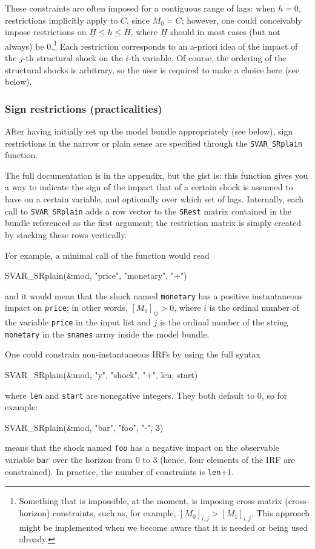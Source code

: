 \documentclass[a4paper,10pt]{article}
\begin{document}
These constraints are often imposed for a contiguous range of lags:
when $h=0$, restrictions implicitly apply to $C$, since $M_0 = C$;
however, one could conceivably impose restrictions on
$\underline{H} \le h \le \overline{H}$, where $\underline{H}$ should
in most cases (but not always) be 0.\footnote{Something that is impossible,
  at the moment, is imposing cross-matrix (cross-horizon) constraints, such 
  as, for example, $[M_0]_{i,j} > [M_1]_{i,j}$. This approach might be 
  implemented when we become aware that it is needed or being used 
  already.} Each restriction corresponds to an
a-priori idea of the impact of the $j$-th structural shock on the
$i$-th variable. Of course, the ordering of the structural shocks is
arbitrary, so the user is required to make a choice here (see below).

\subsubsection{Sign restrictions (practicalities)}

After having initially set up the model bundle appropriately (see
below), sign restrictions in the narrow or plain sense are specified
through the \texttt{SVAR\_SRplain} function.

The full documentation is in the appendix, but the gist is: this
function gives you a way to indicate the sign of the impact that of a
certain shock is assumed to have on a certain variable, and optionally
over which set of lags. Internally, each call to
\texttt{SVAR\_SRplain} adds a row vector to the \texttt{SRest} matrix
contained in the bundle referenced as the first argument; the
restriction matrix is simply created by stacking these rows
vertically.

For example, a minimal call of the function would read
\begin{code}
  SVAR_SRplain(&mod, "price", "monetary", "+")
\end{code}
and it would mean that the shock named \texttt{monetary} has a
positive instantaneous impact on \texttt{price}; in other words,
$[M_0]_{ij} > 0$, where $i$ is the ordinal number of the variable
\texttt{price} in the input list and $j$ is the ordinal number of the
string \texttt{monetary} in the \texttt{snames} array inside the model
bundle.

One could constrain non-instantaneous IRFs by using the full syntax
\begin{code}
SVAR_SRplain(&mod, "y", "shock", "+", len, start)
\end{code}
where \texttt{len} and \texttt{start} are nonegative integers. They
both default to 0, so for example:
\begin{code}
SVAR_SRplain(&mod, "bar", "foo", "-", 3)
\end{code}
means that the shock named \texttt{foo} has a negative impact on the
observable variable \texttt{bar} over the horizon from 0 to 3 (hence,
four elements of the IRF are constrained). In practice, the number of
constraints is \texttt{len}+1. 
\end{document}
